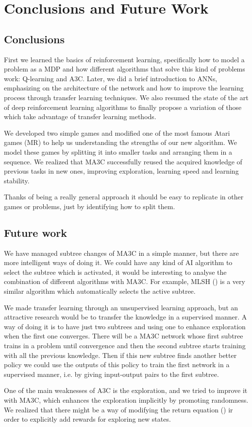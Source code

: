 \chapter{Conclusions and Future Work}
\section{Conclusions}
First we learned the basics of reinforcement learning, specifically how to model a problem as a \acl{MDP} and how different
algorithms that solve this kind of problems work: Q-learning and \acl{A3C}.
Later, we did a brief introduction to \aclp{ANN}, emphasizing on the architecture of the network and how to improve
the learning process through transfer learning techniques.
We also resumed the state of the art of deep reinforcement learning algorithms to finally propose a variation of those
which take advantage of transfer learning methods.

We developed two simple games and modified one of the most famous Atari games (\acl{MR}) to help us understanding the
strengths of our new algorithm.
We model these games by splitting it into smaller tasks and arranging them in a sequence.
We realized that \ac{MA3C} successfully reused the acquired knowledge of previous tasks in new ones, improving exploration,
learning speed and learning stability.

Thanks of being a really general approach it should be easy to replicate in other games or problems, just by identifying
how to split them.

\section{Future work}

We have managed subtree changes of \ac{MA3C} in a simple manner, but there are more intelligent ways of doing it.
We could have any kind of \ac{AI} algorithm to select the subtree which is activated, it would be interesting to analyse
the combination of different algorithms with \ac{MA3C}.
For example, MLSH (\cite{frans2017meta}) is a very similar algorithm which automatically selects the active subtree.

We made transfer learning through an unsupervised learning approach, but an attractive research would be to transfer the
knowledge in a supervised manner.
A way of doing it is to have just two subtrees and using one to enhance exploration when the first one converges.
There will be a \ac{MA3C} network whose first subtree trains in a problem until convergence and then the second subtree
starts training with all the previous knowledge.
Then if this new subtree finds another better policy we could use the outputs of this policy to train the first network
in a supervised manner, i.e. by giving input-output pairs to the first subtree.

One of the main weaknesses of \ac{A3C} is the exploration, and we tried to improve it with \ac{MA3C}, which enhances the
exploration implicitly by promoting randomness.
We realized that there might be a way of modifying the return equation () ir order to explicitly add
rewards for exploring new states.

